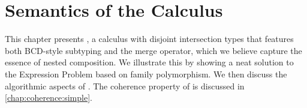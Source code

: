 
\chapter{Semantics of the \namee Calculus}
\label{chap:nested}

This chapter presents \namee, a calculus with disjoint intersection types that
features both BCD-style subtyping and the merge operator, which we believe
capture the essence of nested composition. We illustrate this by showing a neat
solution to the Expression Problem based on family polymorphism. We then discuss
the algorithmic aspects of \namee. The coherence property of \namee is discussed
in \cref{chap:coherence:simple}.






% 



